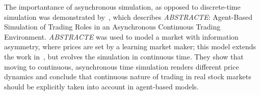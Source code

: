 The importantance of asynchronous simulation, as opposed to discrete-time simulation was demonstrated by~\citet{Sorban2008}, which describes \textit{ABSTRACTE}: Agent-Based Simulation of Trading Roles in an Asynchronous Continuous Trading Environment. \textit{ABSTRACTE} was used to model a market with information asymmetry, where prices are set by a learning market maker; this model extends the work in~\citep{Das2006}, but evolves the simulation in continuous time. They show that moving to continuous, asynchronous time simulation renders different price dynamics and conclude that continuous nature of trading in real stock markets should be explicitly taken into account in agent-based models.









